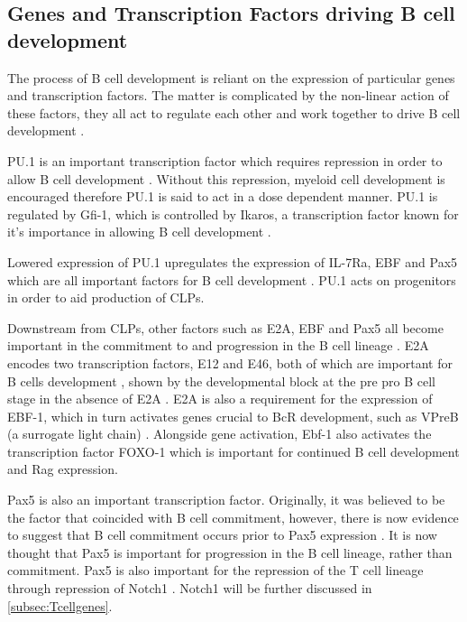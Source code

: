 \subsection{Genes and Transcription Factors driving B cell development}
\label{subsec:Bcellgenes}

The process of B cell development is reliant on the expression of particular genes and transcription factors.
The matter is complicated by the non-linear action of these factors, they all act to regulate each other and work together to drive B cell development \citep{Mandel2010}.

PU.1 is an important transcription factor which requires repression in order to allow B cell development \citep{Dekoter2000}. 
Without this repression, myeloid cell development is encouraged therefore PU.1 is said to act in a dose dependent manner.
PU.1 is regulated by Gfi-1, which is controlled by Ikaros, a transcription factor known for it's importance in allowing B cell development \citep{Yoshida2006}. 

Lowered expression of PU.1 upregulates the expression of IL-7Ra, EBF and Pax5 which are all important factors for B cell development \citep{Hagman2006}.
PU.1 acts on progenitors in order to aid production of CLPs\citep{Hagman2006}.

Downstream from CLPs, other factors such as E2A, EBF and Pax5 all become important in the commitment to and progression in the B cell lineage \citep{Mansson2008}.
E2A encodes two transcription factors, E12 and E46, both of which are important for B cells development \citep{Bain1997}, shown by the developmental block at the pre pro B cell stage in the absence of E2A \citep{Bain1994}.
E2A is also a requirement for the expression of EBF-1, which in turn activates genes crucial to BcR development, such as VPreB (a surrogate light chain) \citep{Welinder2011}.
Alongside gene activation, Ebf-1 also activates the transcription factor FOXO-1 which is important for continued B cell development and Rag expression.

Pax5 is also an important transcription factor.
Originally, it was believed to be the factor that coincided with B cell commitment, however, there is now evidence to suggest that B cell commitment occurs prior to Pax5 expression \citep{Mansson2008}.
It is now thought that Pax5 is important for progression in the B cell lineage, rather than commitment.
Pax5 is also important for the repression of the T cell lineage through repression of Notch1 \citep{Souabni2002}.
Notch1 will be further discussed in \cref{subsec:Tcellgenes}.

